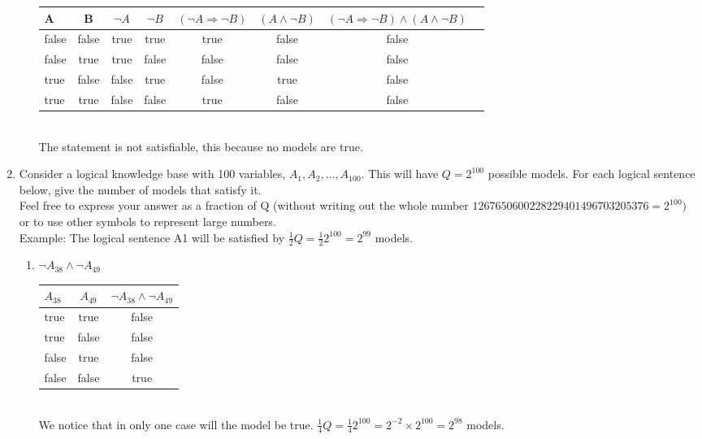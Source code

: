 \documentclass[paper=a4, fontsize=11pt]{scrartcl} %
\numberwithin{equation}{section} %
\numberwithin{figure}{section} %
\numberwithin{table}{section} %
\begin{document}
\begin{enumerate}
\begin{enumerate}
		\begin{tabular}{l c c c c c c c}
			\hline 
			A & B & $\neg A$ & $\neg B$ & $(\neg A \Rightarrow \neg B)$ & $(A \wedge \neg B)$ & $(\neg A \Rightarrow \neg B) \wedge (A \wedge \neg B)$ \\
			\hline
			false 	& false 	& true 		& true 		& true  	&false		&false \\
			false 	& true 		& true 		& false	 	& false 	&false		&false \\
			true 	& false 	& false 	& true 		& false 	&true		&false\\
			true 	& true 		& false	 	& false		& true 	 	&false		&false\\
		\end{tabular}
		\\
		
		The statement is not satisfiable, this because no models are true.
	\end{enumerate}
	

	\item 
	Consider a logical knowledge base with 100 variables, $ A_1, A_2, . . . , A_100.$ This will have $Q =2^{100}$
	possible models. For each logical sentence below, give the number of models that satisfy it.\\

	Feel free to express your answer as a fraction of Q (without writing out the whole number
	$1267650600228229401496703205376 = 2^{100})$ or to use other symbols to represent large numbers. \\

	Example: The logical sentence A1 will be satisfied by $ \frac{1}{2}Q = \frac{1}{2}2^{100} = 2^{99}$ models.\\

	\begin{enumerate}
		\item 
		$\neg A_{38} \wedge \neg A_{49}$

		\begin{tabular}{l c c}
			\hline
			$A_{38}$ & $A_{49}$ & $\neg A_{38} \wedge \neg A_{49}$ \\
			\hline
			true 	& true 	&false\\
			true 	& false &false\\
			false 	& true  &false\\
			false 	& false &true\\
		\end{tabular}
		\\
		
		We notice that in only one case will the model be true. $\frac{1}{4}Q = \frac{1}{4}2^{100} = 2^{-2} \times 2^{100} = 2^{98}$ models.


\end{enumerate}
\end{enumerate}
\end{document}
